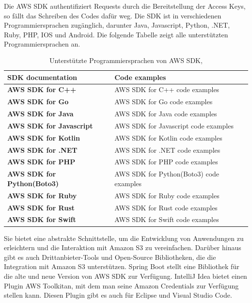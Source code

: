 Die AWS SDK authentifiziert Requests durch die Bereitstellung der Access Keys, so fällt das Schreiben des Codes dafür weg. Die SDK ist in verschiedenen Programmiersprachen zugänglich, darunter Java, Javascript, Python, .NET, Ruby, PHP, IOS und Android. Die folgende Tabelle zeigt alle unterstützten Programmiersprachen an.

\begin{table}[!h]
\centering
\begin{tabular}{ |p{5.5cm}|p{7cm}| }
\hline
\rowcolor{gray!30}
\textbf{SDK documentation} & \textbf{Code examples}\\
\hline
\textbf{AWS SDK for C++} & AWS SDK for C++ code examples\\
\textbf{AWS SDK for Go} & AWS SDK for Go code examples\\
\textbf{AWS SDK for Java}   & AWS SDK for Java code examples\\
\textbf{AWS SDK for Javascript}  & AWS SDK for Javascript code examples\\
\textbf{AWS SDK for Kotlin} & AWS SDK for Kotlin code examples\\
\textbf{AWS SDK for .NET} & AWS SDK for .NET code examples\\
\textbf{AWS SDK for PHP} & AWS SDK for PHP code examples\\
\textbf{AWS SDK for Python(Boto3)} & AWS SDK for Python(Boto3) code examples\\
\textbf{AWS SDK for Ruby} & AWS SDK for Ruby code examples\\
\textbf{AWS SDK for Rust} & AWS SDK for Rust code examples\\
\textbf{AWS SDK for Swift} & AWS SDK for Swift code examples\\
\hline
\end{tabular}
\caption{Unterstützte Programmiersprachen von AWS SDK, }
\end{table}

Sie bietet eine abstrakte Schnittstelle, um die Entwicklung von Anwendungen zu erleichtern und die Interaktion mit Amazon S3 zu vereinfachen. Darüber hinaus gibt es auch Drittanbieter-Tools und Open-Source Bibliotheken, die die Integration mit Amazon S3 unterstützen. Spring Boot stellt eine Bibliothek für die alte und neue Version von AWS SDK zur Verfügung. IntelliJ Idea bietet einen Plugin \glqq AWS Toolkit\grqq an, mit dem man seine Amazon Credentials zur Verfügung stellen kann. Diesen Plugin gibt es auch für Eclipse und Visual Studio Code.\\

